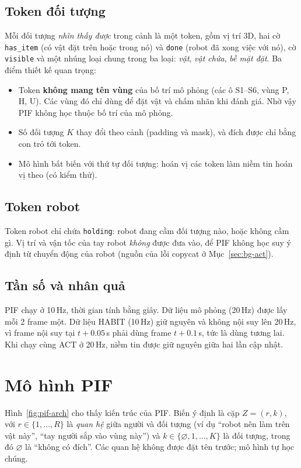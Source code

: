 \subsection{Token đối tượng}

Mỗi đối tượng \emph{nhìn thấy được} trong cảnh là một token, gồm vị trí 3D, hai cờ \texttt{has\_item} (có vật đặt trên hoặc trong nó) và \texttt{done} (robot đã xong việc với nó), cờ \texttt{visible} và một nhúng loại chung trong ba loại: \emph{vật}, \emph{vật chứa}, \emph{bề mặt đặt}. Ba điểm thiết kế quan trọng:
\begin{itemize}
  \item Token \textbf{không mang tên vùng} của bố trí mô phỏng (các ô S1--S6, vùng P, H, U). Các vùng đó chỉ dùng để đặt vật và chấm nhãn khi đánh giá. Nhờ vậy PIF không học thuộc bố trí của mô phỏng.
  \item Số đối tượng $K$ thay đổi theo cảnh (padding và mask), và đích được chỉ bằng con trỏ tới token.
  \item Mô hình bất biến với thứ tự đối tượng: hoán vị các token làm niềm tin hoán vị theo (có kiểm thử).
\end{itemize}

\subsection{Token robot}

Token robot chỉ chứa \texttt{holding}: robot đang cầm đối tượng nào, hoặc không cầm gì. Vị trí và vận tốc của tay robot \emph{không} được đưa vào, để PIF không học suy ý định từ chuyển động của robot (nguồn của lỗi copycat ở Mục~\ref{sec:bg-act}).

\subsection{Tần số và nhân quả}

PIF chạy ở 10\,Hz, thời gian tính bằng giây. Dữ liệu mô phỏng (20\,Hz) được lấy mỗi 2 frame một. Dữ liệu HABIT (10\,Hz) giữ nguyên và không nội suy lên 20\,Hz, vì frame nội suy tại $t+0.05$\,s phải dùng frame $t+0.1$\,s, tức là dùng tương lai. Khi chạy cùng ACT ở 20\,Hz, niềm tin được giữ nguyên giữa hai lần cập nhật.

\section{Mô hình PIF}
\label{sec:method-pif}

Hình~\ref{fig:pif-arch} cho thấy kiến trúc của PIF. Biến ý định là cặp $Z=(r,k)$, với $r\in\{1,\dots,R\}$ là \emph{quan hệ} giữa người và đối tượng (ví dụ ``robot nên làm trên vật này'', ``tay người sắp vào vùng này'') và $k\in\{\varnothing,1,\dots,K\}$ là đối tượng, trong đó $\varnothing$ là ``không có đích''. Các quan hệ không được đặt tên trước; mô hình tự học chúng.

